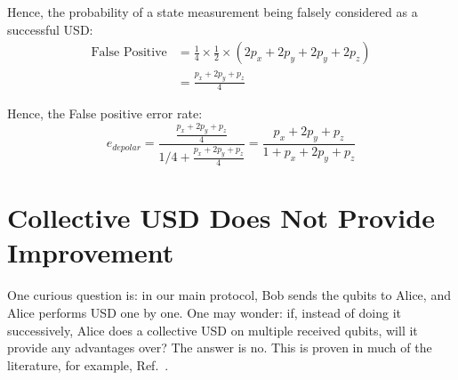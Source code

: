\documentclass[%
 reprint,
superscriptaddress,
 amsmath,amssymb,
 aps,
]{revtex4-2}
\begin{document}
Hence, the probability of a state measurement being falsely considered as a successful USD:
\begin{equation}
\begin{split}
    \text{False Positive}&=\frac{1}{4}\times\frac{1}{2}\times\left(2p_x+2p_y+2p_y+2p_z\right)\\
    &=\frac{p_x+2p_y+p_z}{4}
    \end{split}
\end{equation}

Hence, the False positive error rate:
\begin{equation}
    e_{depolar}=\frac{\frac{p_x+2p_y+p_z}{4}}{1/4+\frac{p_x+2p_y+p_z}{4}}=\frac{p_x+2p_y+p_z}{1+p_x+2p_y+p_z}
\end{equation}

\section{Collective USD Does Not Provide Improvement}

One curious question is: in our main protocol, Bob sends the qubits to Alice, and Alice performs USD one by one. One may wonder: if, instead of doing it successively, Alice does a collective USD on multiple received qubits, will it provide any advantages over? The answer is no. This is proven in much of the literature, for example, Ref.~\cite{USD_one_by_one}.



\end{document}
